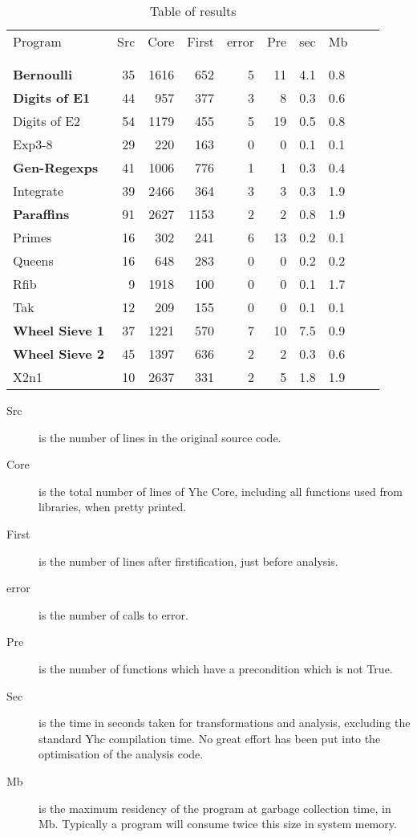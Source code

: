 \documentclass[preprint]{sigplanconf}
\newcommand{\C}[1]{\textsf{#1}}
\begin{document}
\begin{table}
\begin{tabular}{lrrrrrrlll}
Program               & Src & Core & First & \C{error} & Pre & sec & Mb \\
\vspace{-2.2ex} \\
\hline
\vspace{-1.8ex} \\
\textbf{Bernoulli}     & 35 & 1616 &  652 & 5 & 11 & 4.1 & 0.8 \\
\textbf{Digits of E1}  & 44 &  957 &  377 & 3 &  8 & 0.3 & 0.6 \\
Digits of E2           & 54 & 1179 &  455 & 5 & 19 & 0.5 & 0.8 \\
Exp3-8                 & 29 &  220 &  163 & 0 &  0 & 0.1 & 0.1 \\
\textbf{Gen-Regexps}   & 41 & 1006 &  776 & 1 &  1 & 0.3 & 0.4 \\
Integrate              & 39 & 2466 &  364 & 3 &  3 & 0.3 & 1.9 \\
\textbf{Paraffins}     & 91 & 2627 & 1153 & 2 &  2 & 0.8 & 1.9 \\
Primes                 & 16 &  302 &  241 & 6 & 13 & 0.2 & 0.1 \\
Queens                 & 16 &  648 &  283 & 0 &  0 & 0.2 & 0.2 \\
Rfib                   &  9 & 1918 &  100 & 0 &  0 & 0.1 & 1.7 \\
Tak                    & 12 &  209 &  155 & 0 &  0 & 0.1 & 0.1 \\
\textbf{Wheel Sieve 1} & 37 & 1221 &  570 & 7 & 10 & 7.5 & 0.9 \\
\textbf{Wheel Sieve 2} & 45 & 1397 &  636 & 2 &  2 & 0.3 & 0.6 \\
X2n1                   & 10 & 2637 &  331 & 2 &  5 & 1.8 & 1.9 \\
\end{tabular}

\begin{description}
\item[Src] is the number of lines in the original source code.
\item[Core] is the total number of lines of Yhc Core, including all functions used from libraries, when pretty printed.
\item[First] is the number of lines after firstification, just before analysis.
\item[\C{error}] is the number of calls to error.
\item[Pre] is the number of functions which have a precondition which is not True.
\item[Sec] is the time in seconds taken for transformations and analysis, excluding the standard Yhc compilation time. No great effort has been put into the optimisation of the analysis code.
\item[Mb] is the maximum residency of the program at garbage collection time, in Mb. Typically a program will consume twice this size in system memory.
\end{description}
\caption{Table of results}
\label{tab:results}
\end{table}
\end{document}
